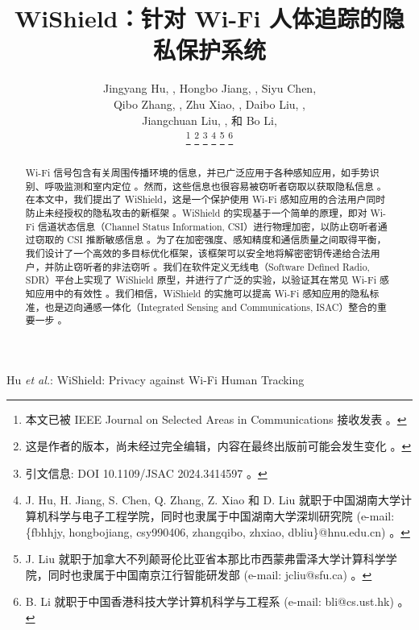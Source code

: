 \documentclass[journal]{IEEEtran}
\begin{document}
\title{WiShield：针对 Wi-Fi 人体追踪的隐私保护系统}

\author{
Jingyang Hu, , Hongbo Jiang, , Siyu Chen, \\
Qibo Zhang, , Zhu Xiao, , Daibo Liu, , \\
Jiangchuan Liu, , 和 Bo Li, 

\thanks{本文已被 IEEE Journal on Selected Areas in Communications 接收发表 。}
\thanks{这是作者的版本，尚未经过完全编辑，内容在最终出版前可能会发生变化 。}
\thanks{引文信息: DOI 10.1109/JSAC 2024.3414597 。}
\thanks{J. Hu, H. Jiang, S. Chen, Q. Zhang, Z. Xiao 和 D. Liu 就职于中国湖南大学计算机科学与电子工程学院，同时也隶属于中国湖南大学深圳研究院 (e-mail: \{fbhhjy, hongbojiang, csy990406, zhangqibo, zhxiao, dbliu\}@hnu.edu.cn) 。}
\thanks{J. Liu 就职于加拿大不列颠哥伦比亚省本那比市西蒙弗雷泽大学计算科学学院，同时也隶属于中国南京江行智能研发部 (e-mail: jcliu@sfu.ca) 。}
\thanks{B. Li 就职于中国香港科技大学计算机科学与工程系 (e-mail: bli@cs.ust.hk) 。}
}

%
{Hu \MakeLowercase{\textit{et al.}}: WiShield: Privacy against Wi-Fi Human Tracking}

\maketitle

\begin{abstract}
Wi-Fi 信号包含有关周围传播环境的信息，并已广泛应用于各种感知应用，如手势识别、呼吸监测和室内定位 。然而，这些信息也很容易被窃听者窃取以获取隐私信息 。在本文中，我们提出了 WiShield，这是一个保护使用 Wi-Fi 感知应用的合法用户同时防止未经授权的隐私攻击的新框架 。WiShield 的实现基于一个简单的原理，即对 Wi-Fi 信道状态信息（Channel Status Information, CSI）进行物理加密，以防止窃听者通过窃取的 CSI 推断敏感信息 。为了在加密强度、感知精度和通信质量之间取得平衡，我们设计了一个高效的多目标优化框架，该框架可以安全地将解密密钥传递给合法用户，并防止窃听者的非法窃听 。我们在软件定义无线电（Software Defined Radio, SDR）平台上实现了 WiShield 原型，并进行了广泛的实验，以验证其在常见 Wi-Fi 感知应用中的有效性 。我们相信，WiShield 的实施可以提高 Wi-Fi 感知应用的隐私标准，也是迈向通感一体化（Integrated Sensing and Communications, ISAC）整合的重要一步 。
\end{abstract}
\end{document}
